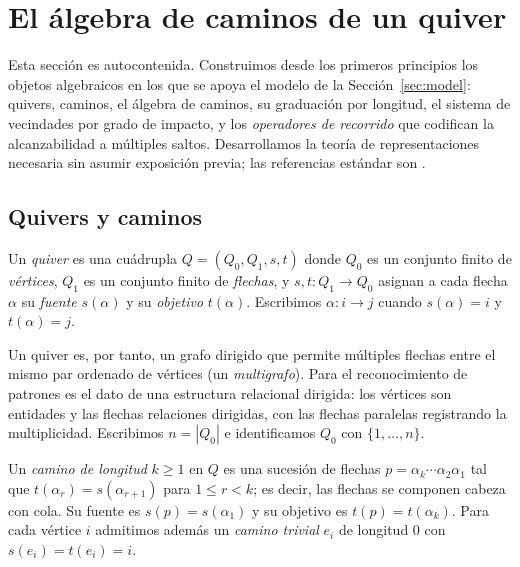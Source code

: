 \section{El álgebra de caminos de un quiver}\label{sec:algebra}

Esta sección es autocontenida. Construimos desde los primeros principios los
objetos algebraicos en los que se apoya el modelo de la Sección~\ref{sec:model}:
quivers, caminos, el álgebra de caminos, su graduación por longitud, el sistema de
vecindades por grado de impacto, y los \emph{operadores de recorrido} que codifican
la alcanzabilidad a múltiples saltos. Desarrollamos la
teoría de representaciones necesaria sin asumir exposición previa; las
referencias estándar son \cite{schiffler2014quiver,assem2006elements}.

\subsection{Quivers y caminos}

\begin{definition}[Quiver]
Un \emph{quiver} es una cuádrupla $Q=(Q_0,Q_1,s,t)$ donde $Q_0$ es un conjunto
finito de \emph{vértices}, $Q_1$ es un conjunto finito de \emph{flechas}, y
$s,t\colon Q_1\to Q_0$ asignan a cada flecha $\alpha$ su \emph{fuente}
$s(\alpha)$ y su \emph{objetivo} $t(\alpha)$. Escribimos $\alpha\colon i\to j$ cuando
$s(\alpha)=i$ y $t(\alpha)=j$.
\end{definition}

Un quiver es, por tanto, un grafo dirigido que permite múltiples flechas
entre el mismo par ordenado de vértices (un \emph{multigrafo}). Para el
reconocimiento de patrones es el dato de una estructura relacional
dirigida: los vértices son entidades y las flechas relaciones dirigidas, con las
flechas paralelas registrando la multiplicidad. Escribimos $n=|Q_0|$ e identificamos
$Q_0$ con $\{1,\dots,n\}$.

\begin{definition}[Camino]
Un \emph{camino de longitud} $k\ge 1$ en $Q$ es una sucesión de flechas
$p=\alpha_k\cdots\alpha_2\alpha_1$ tal que $t(\alpha_r)=s(\alpha_{r+1})$ para
$1\le r<k$; es decir, las flechas se componen cabeza con cola. Su fuente es
$s(p)=s(\alpha_1)$ y su objetivo es $t(p)=t(\alpha_k)$. Para cada vértice $i$
admitimos además un \emph{camino trivial} $e_i$ de longitud $0$ con $s(e_i)=t(e_i)=i$.
\end{definition}

